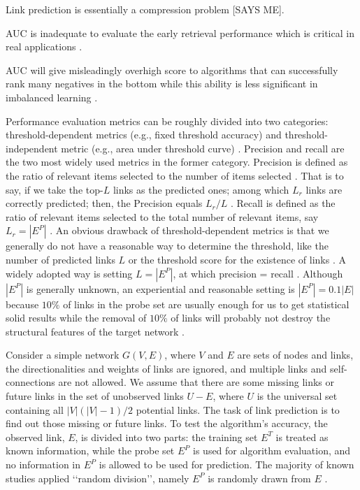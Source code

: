 Link prediction is essentially a compression problem [SAYS ME].


AUC is inadequate to evaluate the early retrieval performance which is critical in real applications \cite{zhou2021progresses}.

AUC will give misleadingly overhigh score to algorithms that can successfully rank many negatives in the bottom while this ability is less significant in imbalanced learning \cite{yang2015evaluating, lichtnwalter2012link}.

Performance evaluation metrics can be roughly divided into two categories: threshold-dependent metrics (e.g., fixed threshold accuracy) and threshold-independent metric (e.g., area under threshold curve) \cite{zhou2021progresses}. Precision and recall are the two most widely used metrics in the former category. Precision is defined as the ratio of relevant items selected to the number of items selected \cite{zhou2021progresses}. That is to say, if we take the top-$L$ links as the predicted ones; among which $L_r$ links are correctly predicted; then, the Precision equals $L_r/L$ \cite{zhou2021progresses}. Recall is defined as the ratio of relevant items selected to the total number of relevant items, say $L_r = |E^P|$ \cite{zhou2021progresses}. An obvious drawback of threshold-dependent metrics is that we generally do not have a reasonable way to determine the threshold, like the number of predicted links $L$ or the threshold score for the existence of links \cite{zhou2021progresses}. A widely adopted way is setting $L = |E^P|$, at which precision = recall \cite{lu2011link, liben2003link, zhou2021progresses}. Although $|E^P|$ is generally unknown, an experiential and reasonable setting is  $|E^P| = 0.1 |E|$ because $10\%$ of links in the probe set are usually enough for us to get statistical solid results while the removal of $10\%$ of links will probably not destroy the structural features of the target network \cite{lu2015toward}.

Consider a simple network $G(V, E)$, where $V$ and $E$ are sets of nodes and links, the directionalities and weights of links are ignored, and multiple links and self-connections are not allowed. We assume that there are some missing links or future links in the set of unobserved links $U - E$, where $U$ is the universal set containing all $|V|(|V|-1)/2$ potential links. The task of link prediction is to find out those missing or future links. To test the algorithm’s accuracy, the observed link, $E$, is divided into two parts: the training set $E^T$ is treated as known information, while the probe set $E^P$ is used for algorithm evaluation, and no information in $E^P$ is allowed to be used for prediction. The majority of known studies applied ‘‘random division’’, namely $E^P$ is randomly drawn from $E$ \cite{zhou2021progresses}.

